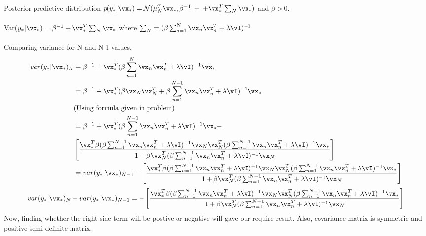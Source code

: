 \documentclass[a4paper,11pt]{article}
\begin{document}
\begin{pmisolution} 
Posterior predictive distribution \(p(y_{\ast}|\vx_{\ast}) = \mathcal{N}(\mu_{N}^{T}\vx_{\ast}, \beta^{-1} \: + \: + \vx_{\ast}^{T}\sum_{N}\vx_{\ast})\) and \(\beta > 0\).\\
\\
Var(\(y_{\ast}|\vx_{\ast}) = \beta^{-1} + \vx_{\ast}^{T}\sum_{N}\vx_{\ast}\) \hfill where \(\sum_{N} = (\beta\sum_{n=1}^{N}\vx_{n}\vx_{n}^{T} + \lambda\vI)^{-1}\)\\
\\
Comparing variance for N and N-1 values,
 \begin{align*}
     var(y_{\ast}|\vx_{\ast})_{N} &= \beta^{-1} + \vx_{\ast}^{T}(\beta\sum_{n=1}^{N}\vx_{n}\vx_{n}^{T} + \lambda\vI)^{-1}\vx_{\ast} \\
     &= \beta^{-1} + \vx_{\ast}^{T}( \beta\vx_{N}\vx_{N}^{T} + \beta\sum_{n=1}^{N-1}\vx_{n}\vx_{n}^{T} + \lambda\vI)^{-1}\vx_{\ast}\\
     & \text{(Using formula given in problem)}\\
     &= \beta^{-1}+\vx_{\ast}^{T}(\beta\sum_{n=1}^{N-1}\vx_{n}\vx_{n}^{T}+\lambda\vI)^{-1}\vx_{\ast} - \\
     & \left[ \frac{\vx_{\ast}^{T}\beta(\beta\sum_{n=1}^{N-1}\vx_{n}\vx_{n}^{T}+\lambda\vI)^{-1}\vx_{N}\vx_{N}^{T}(\beta\sum_{n=1}^{N-1}\vx_{n}\vx_{n}^{T}+\lambda\vI)^{-1}\vx_{\ast}}{1+\beta\vx_{N}^{T}(\beta\sum_{n=1}^{N-1}\vx_{n}\vx_{n}^{T}+\lambda\vI)^{-1}\vx_{N}}\right] \\
     &= var(y_{\ast}|\vx_{\ast})_{N-1} - \left[ \frac{\vx_{\ast}^{T}\beta(\beta\sum_{n=1}^{N-1}\vx_{n}\vx_{n}^{T} + \lambda\vI)^{-1}\vx_{N}\vx_{N}^{T}(\beta\sum_{n=1}^{N-1}\vx_{n}\vx_{n}^{T} + \lambda\vI)^{-1}\vx_{\ast}}{1 + \beta \vx_{N}^{T}(\beta\sum_{n=1}^{N-1}\vx_{n}\vx_{n}^{T} + \lambda\vI) ^{-1}\vx_{N}}\right]
 \end{align*}
 \begin{align*}
     var(y_{\ast}|\vx_{\ast})_{N} - var(y_{\ast}|\vx_{\ast})_{N-1} = - \left[ \frac{\vx_{\ast}^{T}\beta(\beta\sum_{n=1}^{N-1}\vx_{n}\vx_{n}^{T} + \lambda\vI)^{-1}\vx_{N}\vx_{N}^{T}(\beta\sum_{n=1}^{N-1}\vx_{n}\vx_{n}^{T} + \lambda\vI)^{-1}\vx_{\ast}}{1 + \beta \vx_{N}^{T}(\beta\sum_{n=1}^{N-1}\vx_{n}\vx_{n}^{T} + \lambda\vI) ^{-1}\vx_{N}}\right]\\
 \end{align*}
Now, finding whether the right side term will be postive or negative will gave our require result. Also, covariance matrix is symmetric and positive semi-definite matrix. \\

\end{pmisolution}
\end{document}
